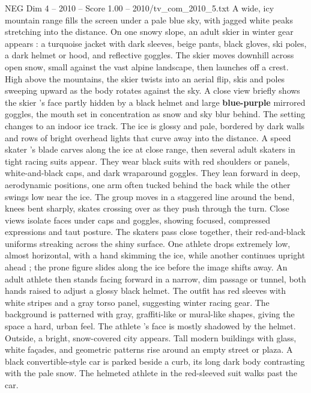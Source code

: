 \begin{textsample}{NEG Dim 4 – 2010 – Score 1.00 – 2010/tv\_com\_2010\_5.txt}  \label{ex:f4_neg_077}
A wide, icy mountain range fills the screen under a pale blue sky, with jagged white peaks stretching into the distance.
On one snowy slope, an adult skier in winter gear appears : a turquoise jacket with dark sleeves, beige pants, black gloves, ski poles, a dark helmet or hood, and reflective goggles.
The skier moves downhill across open snow, small against the vast alpine landscape, then launches off a crest.
High above the mountains, the skier twists into an aerial flip, skis and poles sweeping upward as the body rotates against the sky.
A close view briefly shows the skier ’s face partly hidden by a black helmet and large \textbf{blue-purple} mirrored goggles, the mouth set in concentration as snow and sky blur behind.
The setting changes to an indoor ice track.
The ice is glossy and pale, bordered by dark walls and rows of bright overhead lights that curve away into the distance.
A speed skater ’s blade carves along the ice at close range, then several adult skaters in tight racing suits appear.
They wear black suits with red shoulders or panels, white-and-black caps, and dark wraparound goggles.
They lean forward in deep, aerodynamic positions, one arm often tucked behind the back while the other swings low near the ice.
The group moves in a staggered line around the bend, knees bent sharply, skates crossing over as they push through the turn.
Close views isolate faces under caps and goggles, showing focused, compressed expressions and taut posture.
The skaters pass close together, their red-and-black uniforms streaking across the shiny surface.
One athlete drops extremely low, almost horizontal, with a hand skimming the ice, while another continues upright ahead ; the prone figure slides along the ice before the image shifts away.
An adult athlete then stands facing forward in a narrow, dim passage or tunnel, both hands raised to adjust a glossy black helmet.
The outfit has red sleeves with white stripes and a gray torso panel, suggesting winter racing gear.
The background is patterned with gray, graffiti-like or mural-like shapes, giving the space a hard, urban feel.
The athlete ’s face is mostly shadowed by the helmet.
Outside, a bright, snow-covered city appears.
Tall modern buildings with glass, white façades, and geometric patterns rise around an empty street or plaza.
A black convertible-style car is parked beside a curb, its long dark body contrasting with the pale snow.
The helmeted athlete in the red-sleeved suit walks past the car.

\end{textsample}
